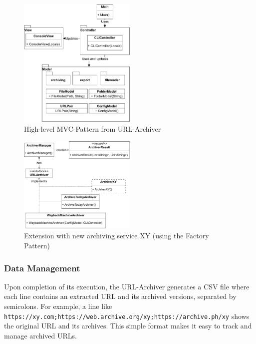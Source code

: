 \begin{figure}
	\includegraphics[width=0.5\textwidth]{./diagrams/mvc_diagram-Highlevel_MVC.pdf}
	\centering
	\caption{High-level MVC-Pattern  from URL-Archiver}
	\label{fig:mvc_highlevel}
\end{figure}

\begin{figure}
	\includegraphics[width=0.5\textwidth]{./diagrams/URL_Archiver_Class_Diagram-ArchiverManager.pdf}
	\centering
	\caption{Extension with new archiving service XY (using the Factory Pattern)}
	\label{fig:factory_pattern_archiving_services}
\end{figure}

\subsubsection{Data Management}
Upon completion of its execution, the URL-Archiver generates a CSV file where each line contains an extracted URL and its archived versions, separated by semicolons. For example, a line like \texttt{https://xy.com;https://web.archive.org/xy;https://archive.ph/xy} shows the original URL and its archives. This simple format makes it easy to track and manage archived URLs. 

